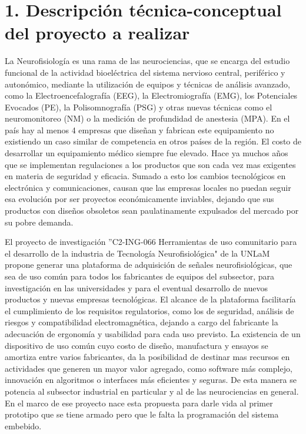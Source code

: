 \documentclass[
11pt, %
codirector, %
]{charter}
\begin{document}
\section{1. Descripción técnica-conceptual del proyecto a realizar}
\label{sec:descripcion}


La Neurofisiología es una rama de las neurociencias, que se encarga del estudio funcional de la actividad bioeléctrica del sistema nervioso central, periférico y autonómico, mediante la utilización de equipos y técnicas de análisis avanzado, como la Electroencefalografía (EEG), la Electromiografía (EMG), los Potenciales Evocados (PE), la Polisomnografía (PSG) y otras nuevas técnicas como el neuromonitoreo (NM) o la medición de profundidad de anestesia (MPA). En el país hay al menos 4 empresas que diseñan y fabrican este equipamiento no existiendo un caso similar de competencia en otros países de la región. El costo de desarrollar un equipamiento médico siempre fue elevado. Hace ya muchos años que se implementan regulaciones a los productos que son cada vez mas exigentes en materia de seguridad y eficacia. Sumado a esto los cambios tecnológicos en electrónica y comunicaciones, causan que las empresas locales no puedan seguir esa evolución por ser proyectos económicamente inviables, dejando que sus productos con diseños obsoletos sean paulatinamente expulsados del mercado por su pobre demanda. 

El proyecto de investigación ''C2-ING-066 Herramientas de uso comunitario para el desarrollo de la industria de Tecnología Neurofisiológica" de la UNLaM propone generar una plataforma de adquisición de señales neurofisiológicas, que sea de uso común para todos los fabricantes de equipos del subsector, para investigación en las universidades y para el eventual desarrollo de nuevos productos y nuevas empresas tecnológicas. El alcance de la plataforma facilitaría el cumplimiento de los requisitos regulatorios, como los de seguridad, análisis de riesgos y compatibilidad electromagnética, dejando a cargo del fabricante la adecuación de ergonomía y usabilidad para cada uso previsto. La existencia de un dispositivo de uso común cuyo costo de diseño, manufactura y ensayos se amortiza entre varios fabricantes, da la posibilidad de destinar mas recursos en actividades que generen un mayor valor agregado, como software más complejo, innovación en algoritmos o interfaces más eficientes y seguras. De esta manera se potencia al subsector industrial en particular y al de las neurociencias en general. En el marco de ese proyecto nace esta propuesta para darle vida al primer prototipo que se tiene armado pero que le falta la programación del sistema embebido.
\end{document}
